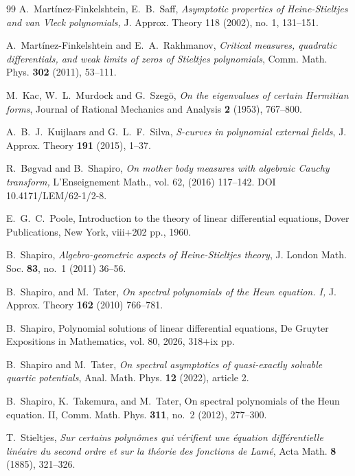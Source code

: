 \documentclass[10pt,twoside,a4paper,reqno]{amsart}
\theoremstyle{plain}
\theoremstyle{definition}
\theoremstyle{remark}
\begin{document}
\begin{thebibliography}{99}
 A.~Mart\'inez-Finkelshtein, E.~B.~Saff,  {\em Asymptotic properties of Heine-Stieltjes and van Vleck polynomials,} J. Approx. Theory 118 (2002), no. 1, 131--151. 

A.~Mart\'inez-Finkelshtein and E.~A.~Rakhmanov,
{\em Critical measures, quadratic differentials, and weak limits of zeros of Stieltjes polynomials},
Comm. Math. Phys. {\bf 302} (2011), 53--111.


 M.~Kac, W.~L.~Murdock and G.~Szeg\"o, {\em On the eigenvalues of certain Hermitian forms},
Journal of Rational Mechanics and Analysis {\bf 2} (1953), 767--800.


A.~B.~J.~Kuijlaars and G.~L.~F.~Silva,
{\em S-curves in polynomial external fields},
J. Approx. Theory {\bf 191} (2015), 1--37.

R.~B\o gvad and B.~Shapiro,
{\em On mother body measures with algebraic Cauchy transform,} L'Enseignement Math., vol. 62, (2016) 117--142. DOI 10.4171/LEM/62-1/2-8. 

E.~G.~C.~Poole, Introduction to the theory of linear differential equations, 
Dover Publications, New York, viii+202 pp., 1960. 

  B.~Shapiro, {\em Algebro-geometric aspects of Heine-Stieltjes theory},  J. London Math. Soc.  {\bf 83}, no.~1 (2011) 36--56. 

  B.~Shapiro, and M.~Tater, {\em  On spectral polynomials of the Heun equation. I,}  J. Approx. Theory {\bf 162} (2010) 766--781. 

 B.~Shapiro, Polynomial solutions of linear differential equations, De Gruyter Expositions in
Mathematics, vol. 80, 2026, 318+ix pp.

B.~Shapiro and M.~Tater,
{\em On spectral asymptotics of quasi-exactly solvable quartic potentials},
Anal. Math. Phys. {\bf 12} (2022), article 2.




 B.~Shapiro, K.~Takemura,  and M.~Tater,  On spectral polynomials of the Heun equation. II,   Comm. Math. Phys. {\bf 311}, no.~2 (2012),  277--300. 


T.~Stieltjes, {\em Sur certains polyn\^omes qui
v\'erifient une \'equation diff\'erentielle lin\'eaire du second ordre
et sur la th\'eorie des fonctions de Lam\'e}, Acta Math. {\bf 8} (1885), 
321--326.



\end{thebibliography}
\end{document}

